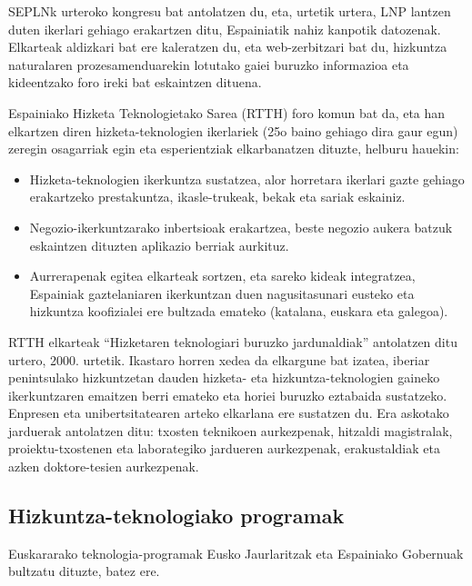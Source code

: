 \begin{multicols}{2}
SEPLNk urteroko kongresu bat antolatzen du, eta, urtetik urtera, LNP lantzen duten ikerlari gehiago erakartzen ditu, Espainiatik nahiz kanpotik datozenak. Elkarteak aldizkari bat ere kaleratzen du, eta web-zerbitzari bat du, hizkuntza naturalaren prozesamenduarekin lotutako gaiei buruzko informazioa eta kideentzako foro ireki bat eskaintzen dituena.

Espainiako Hizketa Teknologietako Sarea (RTTH) \cite{BAS-Nota36}  foro komun bat da, eta han elkartzen diren hizketa-teknologien ikerlariek (25o baino gehiago dira gaur egun) zeregin osagarriak egin eta esperientziak elkarbanatzen dituzte, helburu hauekin:

\begin{itemize}

 \item Hizketa-teknologien ikerkuntza sustatzea, alor horretara ikerlari gazte gehiago erakartzeko prestakuntza, ikasle-trukeak, bekak eta sariak eskainiz.

 \item Negozio-ikerkuntzarako inbertsioak erakartzea, beste negozio aukera batzuk eskaintzen dituzten aplikazio berriak aurkituz. 

 \item Aurrerapenak egitea elkarteak sortzen, eta sareko kideak integratzea, Espainiak gaztelaniaren ikerkuntzan duen nagusitasunari eusteko eta hizkuntza koofizialei ere bultzada emateko (katalana, euskara eta galegoa).

\end{itemize}

RTTH elkarteak “Hizketaren teknologiari buruzko jardunaldiak” antolatzen ditu urtero, 2000. urtetik. Ikastaro horren xedea da elkargune bat izatea,  iberiar penintsulako hizkuntzetan dauden hizketa- eta hizkuntza-teknologien gaineko ikerkuntzaren emaitzen berri emateko eta horiei buruzko eztabaida sustatzeko. Enpresen eta unibertsitatearen arteko elkarlana ere sustatzen du. Era askotako jarduerak antolatzen ditu: txosten teknikoen aurkezpenak, hitzaldi magistralak, proiektu-txostenen eta laborategiko jardueren aurkezpenak, erakustaldiak eta azken doktore-tesien aurkezpenak.

\subsection{Hizkuntza-teknologiako programak}
   Euskararako teknologia-programak Eusko Jaurlaritzak eta Espainiako Gobernuak bultzatu dituzte, batez ere. 


\end{multicols}
